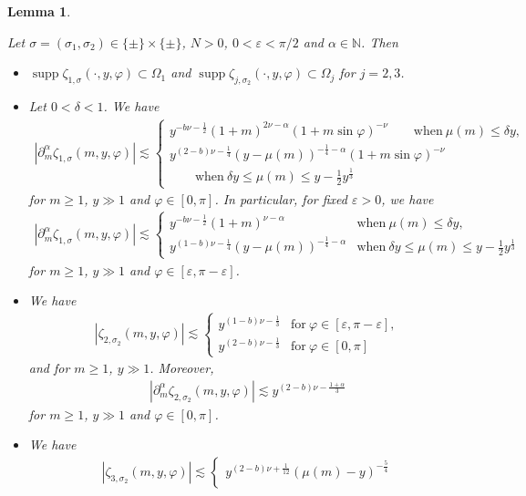 \documentclass[10pt,a4paper]{article}
\numberwithin{equation}{section}
\newtheorem{Lemma}[Theorem]{Lemma}
\def\d{\,\mathrm{d}}%
\DeclareMathOperator{\supp}{supp}%
\def\a{\alpha}
\def\d{\delta}
\def\e{\varepsilon}
\def\f{\varphi}
\def\m{\mu}
\def\n{\nu}
\def\s{\sigma}
\def\z{\zeta}
\def\pa{\partial}
\begin{document}
\begin{Lemma}\label{ampesti}

Let $\s=(\s_1,\s_2)\in \{\pm\}\times\{\pm\}$, $N>0$, $0<\e<\pi/2$ and $\a\in\mathbb{N}$. Then
\begin{itemize}\itemsep=0pt
\item[$(i)$] $\supp \z_{1,\s}(\cdot,y,\f)\subset \Omega_1$ and $\supp \z_{j,\s_2}(\cdot,y,\f)\subset \Omega_j$ for $j=2,3$.
\item[$(ii)$] Let $0<\d<1$. We have
\begin{align*}
|\pa_{m}^{\a}\z_{1,\s}(m,y,\f)|\lesssim \begin{cases}y^{-b\n-\frac{1}{2}}(1+m)^{2\n-\a}(1+m\sin \f)^{-\n} \qquad \text{when}\  \m(m)\leq \d y, \\
y^{(2-b)\n-\frac{1}{4}} (y-\m(m))^{-\frac{1}{4}-\a}(1+m\sin \f)^{-\n}\\
\qquad\text{when}\  \d y\leq \m(m)\leq y-\frac{1}{2}y^{\frac{1}{3}}
\end{cases}
\end{align*}
for $m\geq 1$, $y\gg 1$ and $\f\in [0,\pi]$. In particular, for fixed $\e>0$, we have
\begin{align*}
|\pa_{m}^{\a}\z_{1,\s}(m,y,\f)|\lesssim \begin{cases}y^{-b\n-\frac{1}{2}}(1+m)^{\n-\a}&  \text{when}\  \m(m)\leq \d y,\\
y^{(1-b)\n-\frac{1}{4}} (y-\m(m))^{-\frac{1}{4}-\a}& \text{when}\  \d y\leq \m(m)\leq y-\frac{1}{2}y^{\frac{1}{3}}
\end{cases}
\end{align*}
for $m\geq 1$, $y\gg 1$ and $\f\in [\e,\pi-\e]$.
\item[$(iii)$] We have
\begin{align*}
|\z_{2,\s_2}(m,y,\f)|\lesssim \begin{cases}y^{(1-b)\n-\frac{1}{3}}& \text{for}\  \f\in [\e,\pi-\e],\\
y^{(2-b)\n-\frac{1}{3}}& \text{for}\  \f\in [0,\pi]
\end{cases}
\end{align*}
and for $m\geq 1$, $y\gg 1$. Moreover,
\begin{align*}
|\pa_{m}^{\a}\z_{2,\s_2}(m,y,\f)|\lesssim y^{(2-b)\n-\frac{1+\a}{3}}
\end{align*}
for $m\geq 1$, $y\gg 1$ and $\f\in [0,\pi]$.
\item[$(iv)$]
We have
\begin{align*}%
|\z_{3,\s_2}(m,y,\f)|\lesssim \begin{cases}y^{(2-b)\n+\frac{1}{12}}(\m(m)-y)^{-\frac{5}{4}}\\

\end{cases}
\end{align*}
\end{itemize}
\end{Lemma}
\end{document}
